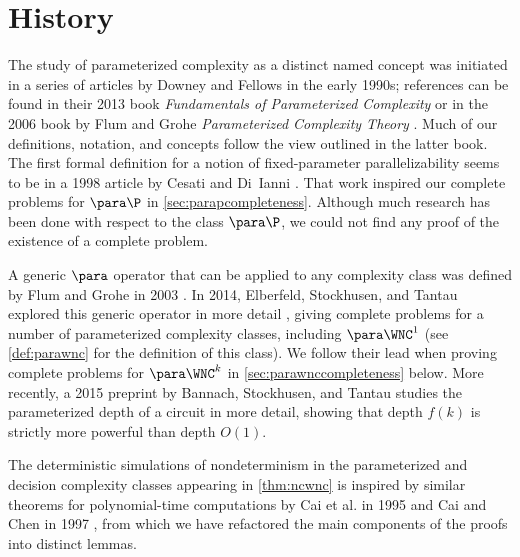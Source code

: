 \section{History}

The study of parameterized complexity as a distinct named concept was initiated in a series of articles by Downey and Fellows in the early 1990s; references can be found in their 2013 book \emph{Fundamentals of Parameterized Complexity} \autocites{df13} or in the 2006 book by Flum and Grohe \emph{Parameterized Complexity Theory} \autocite{fg06}.
Much of our definitions, notation, and concepts follow the view outlined in the latter book.
The first formal definition for a notion of fixed-parameter parallelizability seems to be in a 1998 article by Cesati and Di~Ianni \autocite{cd98}.
That work inspired our complete problems for $\para \P$ in \autoref{sec:parapcompleteness}.
Although much research has been done with respect to the class $\para \P$, we could not find any proof of the existence of a complete problem.

A generic $\para$ operator that can be applied to any complexity class was defined by Flum and Grohe in 2003 \autocite{fg03}.
In 2014, Elberfeld, Stockhusen, and Tantau explored this generic operator in more detail \autocite{est15}, giving complete problems for a number of parameterized complexity classes, including $\para \WNC^1$ (see \autoref{def:parawnc} for the definition of this class).
We follow their lead when proving complete problems for $\para \WNC^k$ in \autoref{sec:parawnccompleteness} below.
More recently, a 2015 preprint by Bannach, Stockhusen, and Tantau \autocite{bst15} studies the parameterized depth of a circuit in more detail, showing that depth $f(k)$ is strictly more powerful than depth $O(1)$.

The deterministic simulations of nondeterminism in the parameterized and decision complexity classes appearing in \autoref{thm:ncwnc} is inspired by similar theorems for polynomial-time computations by Cai et al. in 1995 \autocite{ccdf95} and Cai and Chen in 1997 \autocite{cc97npo}, from which we have refactored the main components of the proofs into distinct lemmas.
